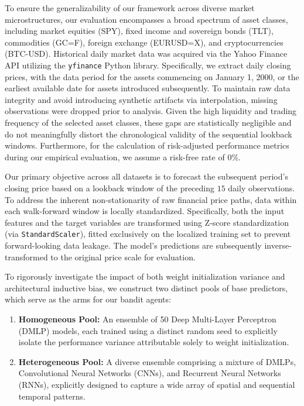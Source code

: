 \documentclass[pdflatex,sn-mathphys-num]{sn-jnl}
\theoremstyle{thmstyleone}%
\theoremstyle{thmstyletwo}%
\theoremstyle{thmstylethree}%
\begin{document}
To ensure the generalizability of our framework across diverse market microstructures, our evaluation encompasses a broad spectrum of asset classes, including market equities (SPY), fixed income and sovereign bonds (TLT), commodities (GC=F), foreign exchange (EURUSD=X), and cryptocurrencies (BTC-USD). Historical daily market data was acquired via the Yahoo Finance API utilizing the \texttt{yfinance} Python library. Specifically, we extract daily closing prices, with the data period for the assets commencing on January 1, 2000, or the earliest available date for assets introduced subsequently. To maintain raw data integrity and avoid introducing synthetic artifacts via interpolation, missing observations were dropped prior to analysis. Given the high liquidity and trading frequency of the selected asset classes, these gaps are statistically negligible and do not meaningfully distort the chronological validity of the sequential lookback windows. Furthermore, for the calculation of risk-adjusted performance metrics during our empirical evaluation, we assume a risk-free rate of 0\%.

Our primary objective across all datasets is to forecast the subsequent period's closing price based on a lookback window of the preceding $15$ daily observations. To address the inherent non-stationarity of raw financial price paths, data within each walk-forward window is locally standardized. Specifically, both the input features and the target variables are transformed using Z-score standardization (via \texttt{StandardScaler}), fitted exclusively on the localized training set to prevent forward-looking data leakage. The model's predictions are subsequently inverse-transformed to the original price scale for evaluation.

To rigorously investigate the impact of both weight initialization variance and architectural inductive bias, we construct two distinct pools of base predictors, which serve as the arms for our bandit agents:
\begin{enumerate}
    \item \textbf{Homogeneous Pool:} An ensemble of 50 Deep Multi-Layer Perceptron (DMLP) models, each trained using a distinct random seed to explicitly isolate the performance variance attributable solely to weight initialization.
    \item \textbf{Heterogeneous Pool:} A diverse ensemble comprising a mixture of DMLPs, Convolutional Neural Networks (CNNs), and Recurrent Neural Networks (RNNs), explicitly designed to capture a wide array of spatial and sequential temporal patterns.
\end{enumerate}
\end{document}

